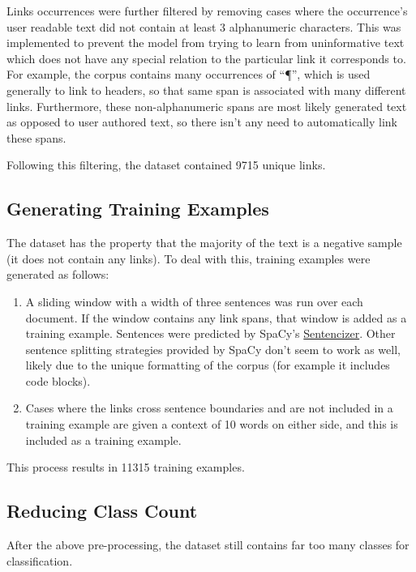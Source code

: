 \documentclass[manuscript,screen,review]{acmart}
\begin{document}
Links occurrences were further filtered by removing cases where the
occurrence's user readable text did not contain at least 3
alphanumeric characters. This was implemented to prevent the model
from trying to learn from uninformative text which does not have any
special relation to the particular link it corresponds to. For
example, the corpus contains many occurrences of ``¶'', which is used
generally to link to headers, so that same span is associated with
many different links. Furthermore, these non-alphanumeric spans are most
likely generated text as opposed to user authored text, so there isn't
any need to automatically link these spans.

Following this filtering, the dataset contained 9715 unique links.

\subsection*{Generating Training Examples}
\label{sec:orge1c2da2}

The dataset has the property that the majority of the text is a
negative sample (it does not contain any links). To deal with this,
training examples were generated as follows:

\begin{enumerate}
\item A sliding window with a width of three sentences was run over each
document. If the window contains any link spans, that window is
added as a training example. Sentences were predicted by SpaCy's
\href{https://spacy.io/usage/linguistic-features\#sbd-component}{Sentencizer}. Other sentence splitting strategies provided by SpaCy
don't seem to work as well, likely due to the unique formatting of
the corpus (for example it includes code blocks).
\item Cases where the links cross sentence boundaries and are not
included in a training example are given a context of 10 words on
either side, and this is included as a training example.
\end{enumerate}


This process results in 11315 training examples.

\subsection*{Reducing Class Count}
\label{sec:org1bfe0a8}

After the above pre-processing, the dataset still contains far too
many classes for classification.
\end{document}
